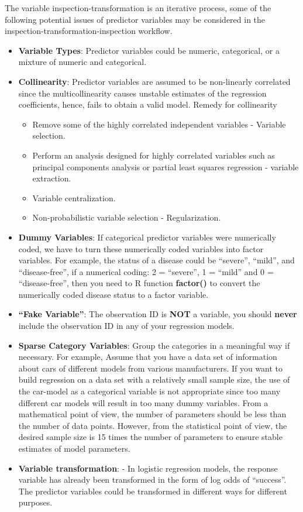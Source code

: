 \documentclass[
]{book}
\begin{document}
The variable inspection-transformation is an iterative process, some of the following potential issues of predictor variables may be considered in the inspection-transformation-inspection workflow.

\begin{itemize}
\item
  \textbf{Variable Types}: Predictor variables could be numeric, categorical, or a mixture of numeric and categorical.
\item
  \textbf{Collinearity}: Predictor variables are assumed to be non-linearly correlated since the multicollinearity causes unstable estimates of the regression coefficients, hence, fails to obtain a valid model. Remedy for collinearity

  \begin{itemize}
  \item
    Remove some of the highly correlated independent variables - Variable selection.
  \item
    Perform an analysis designed for highly correlated variables such as principal components analysis or partial least squares regression - variable extraction.
  \item
    Variable centralization.
  \item
    Non-probabilistic variable selection - Regularization.
  \end{itemize}
\item
  \textbf{Dummy Variables}: If categorical predictor variables were numerically coded, we have to turn these numerically coded variables into factor variables. For example, the status of a disease could be ``severe'', ``mild'', and ``disease-free'', if a numerical coding: 2 = ``severe'', 1 = ``mild'' and 0 = ``disease-free'', then you need to R function \textbf{factor()} to convert the numerically coded disease status to a factor variable.
\item
  \textbf{``Fake Variable''}: The observation ID is \textbf{NOT} a variable, you should \textbf{never} include the observation ID in any of your regression models.
\item
  \textbf{Sparse Category Variables}: Group the categories in a meaningful way if necessary. For example, Assume that you have a data set of information about cars of different models from various manufacturers. If you want to build regression on a data set with a relatively small sample size, the use of the car-model as a categorical variable is not appropriate since too many different car models will result in too many dummy variables. From a mathematical point of view, the number of parameters should be less than the number of data points. However, from the statistical point of view, the desired sample size is 15 times the number of parameters to ensure stable estimates of model parameters.
\item
  \textbf{Variable transformation}: - In logistic regression models, the response variable has already been transformed in the form of log odds of ``success''. The predictor variables could be transformed in different ways for different purposes.


\end{itemize}
\end{document}
